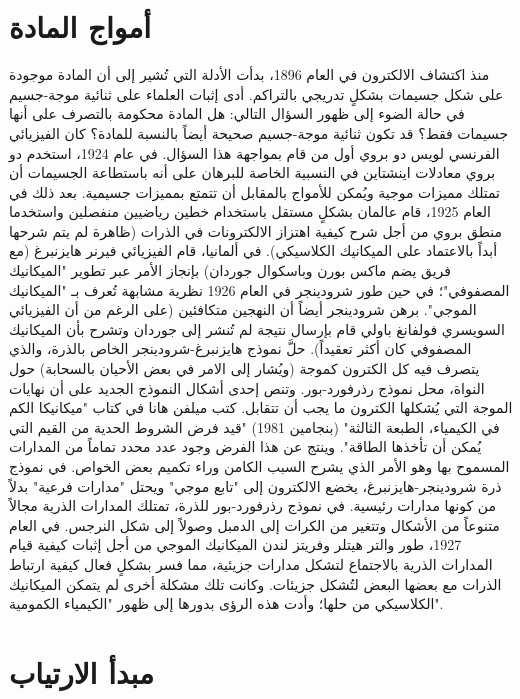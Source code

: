 \section*{أمواج المادة}

منذ اكتشاف الالكترون في العام 1896، بدأت الأدلة التي تُشير إلى أن المادة موجودة على شكل جسيمات بشكلٍ تدريجي بالتراكم. أدى إثبات العلماء على ثنائية موجة-جسيم في حالة الضوء إلى ظهور السؤال التالي: هل المادة محكومة بالتصرف على أنها جسيمات فقط؟ قد تكون ثنائية موجة-جسيم صحيحة أيضاً بالنسبة للمادة؟ كان الفيزيائي الفرنسي لويس دو بروي أول من قام بمواجهة هذا السؤال. في عام 1924، استخدم دو بروي معادلات اينشتاين في النسبية الخاصة للبرهان على أنه باستطاعة الجسيمات أن تمتلك مميزات موجية ويُمكن للأمواج بالمقابل أن تتمتع بمميزات جسيمية. بعد ذلك في العام 1925، قام عالمان بشكلٍ مستقل باستخدام خطين رياضيين منفصلين واستخدما منطق بروي من أجل شرح كيفية اهتزاز الالكترونات في الذرات (ظاهرة لم يتم شرحها أبداً بالاعتماد على الميكانيك الكلاسيكي). في ألمانيا، قام الفيزيائي فيرنر هايزنبرغ (مع فريق يضم ماكس بورن وباسكوال جوردان) بإنجاز الأمر عبر تطوير "الميكانيك المصفوفي"؛ في حين طور شرودينجر في العام 1926 نظرية مشابهة تُعرف بـ "الميكانيك الموجي". برهن شرودينجر أيضاً أن النهجين متكافئين (على الرغم من أن الفيزيائي السويسري فولفانغ باولي قام بإرسال نتيجة لم تُنشر إلى جوردان وتشرح بأن الميكانيك المصفوفي كان أكثر تعقيداً). حلَّ نموذج هايزنبرغ-شرودينجر الخاص بالذرة، والذي يتصرف فيه كل الكترون كموجة (ويُشار إلى الامر في بعض الأحيان بالسحابة) حول النواة، محل نموذج رذرفورد-بور. وتنص إحدى أشكال النموذج الجديد على أن نهايات الموجة التي يُشكلها الكترون ما يجب أن تتقابل. كتب ميلفن هانا في كتاب "ميكانيكا الكم في الكيمياء، الطبعة الثالثة" (بنجامين 1981) "قيد فرض الشروط الحدية من القيم التي يُمكن أن تأخذها الطاقة". وينتج عن هذا الفرض وجود عدد محدد تماماً من المدارات المسموح بها وهو الأمر الذي يشرح السبب الكامن وراء تكميم بعض الخواص. في نموذج ذرة شرودينجر-هايزنبرغ، يخضع الالكترون إلى "تابع موجي" ويحتل "مدارات فرعية" بدلاً من كونها مدارات رئيسية. في نموذج رذرفورد-بور للذرة، تمتلك المدارات الذرية مجالاً متنوعاً من الأشكال وتتغير من الكرات إلى الدمبل وصولاً إلى شكل النرجس. في العام 1927، طور والتر هيتلر وفريتز لندن الميكانيك الموجي من أجل إثبات كيفية قيام المدارات الذرية بالاجتماع لتشكل مدارات جزيئية، مما فسر بشكلٍ فعال كيفية ارتباط الذرات مع بعضها البعض لتُشكل جزيئات. وكانت تلك مشكلة أخرى لم يتمكن الميكانيك الكلاسيكي من حلها؛ وأدت هذه الرؤى بدورها إلى ظهور "الكيمياء الكمومية".

\section*{مبدأ الارتياب}
 
